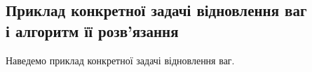 \subsection{Приклад конкретної задачі відновлення ваг\\ і алгоритм її розв'язання}
Наведемо приклад конкретної задачі відновлення ваг.


